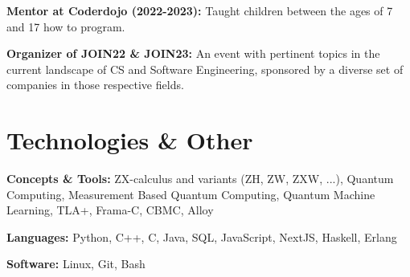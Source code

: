 \documentclass[10pt, letterpaper]{article}
\begin{document}
        
        \begin{onecolentry}
            \textbf{Mentor at Coderdojo (2022-2023):} Taught children between the ages of 7 and 17 how to program.
        \end{onecolentry}
    
        \vspace{0.2 cm}

        \begin{onecolentry}
            \textbf{Organizer of JOIN22 \& JOIN23:} An event with pertinent topics in the current landscape of CS and Software Engineering, sponsored by a diverse set of companies in those respective fields.
        \end{onecolentry}
        

    \section{Technologies \& Other}

        \begin{onecolentry}
            \textbf{Concepts \& Tools:} ZX-calculus and variants (ZH, ZW, ZXW, ...), Quantum Computing, Measurement Based Quantum Computing, Quantum Machine Learning, TLA+, Frama-C, CBMC, Alloy
        \end{onecolentry}

        \vspace{0.2 cm}

        \begin{onecolentry}
            \textbf{Languages:} Python, C++, C, Java, SQL, JavaScript, NextJS, Haskell, Erlang
        \end{onecolentry}

        \vspace{0.2 cm}

        \begin{onecolentry}
            \textbf{Software:} Linux, Git, Bash
        \end{onecolentry}



    
\end{document}
